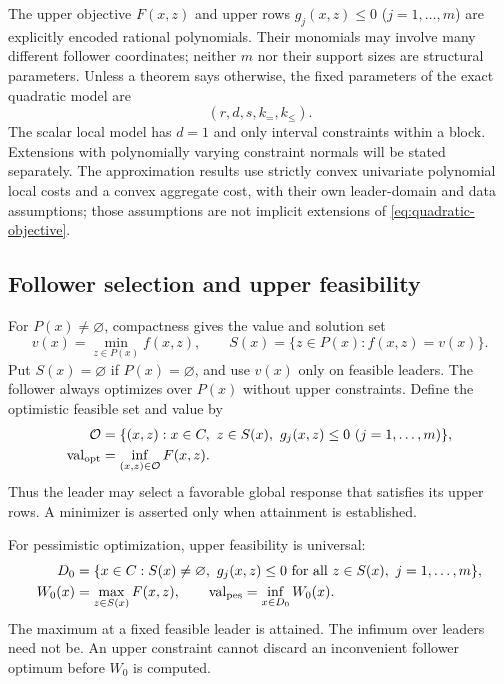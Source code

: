 The upper objective $F(x,z)$ and upper rows $g_j(x,z)\le0$
($j=1,\ldots,m$) are explicitly encoded rational polynomials.
Their monomials may involve many different follower coordinates; neither
$m$ nor their support sizes are structural parameters. Unless a theorem
says otherwise, the fixed parameters of the exact quadratic model are
\begin{equation}\label{eq:structural-parameters}
                    (r,d,s,k_=,k_{\le}).
\end{equation}
The scalar local model has $d=1$ and only interval constraints within a
block. Extensions with polynomially varying constraint normals will be
stated separately. The approximation results use strictly convex
univariate polynomial local costs and a convex aggregate cost, with their
own leader-domain and data assumptions; those assumptions are not
implicit extensions of \eqref{eq:quadratic-objective}.

\subsection{Follower selection and upper feasibility}\label{subsec:semantics}

For $P(x)\ne\varnothing$, compactness gives the value and solution set
\begin{equation}\label{eq:follower-value}
 v(x)=\min_{z\in P(x)} f(x,z),\qquad
 S(x)=\{z\in P(x):f(x,z)=v(x)\}.
\end{equation}
Put $S(x)=\varnothing$ if $P(x)=\varnothing$, and use $v(x)$ only
on feasible leaders. The follower always optimizes over $P(x)$ without
upper constraints. Define the optimistic feasible set and value by
\begin{align}
 \mathcal O&=\{(x,z):x\in C,\ z\in S(x),\
                             g_j(x,z)\le0\ (j=1,\ldots,m)\},
 \label{eq:optimistic-set}\\
 \operatorname{val}_{\rm opt}&=\inf_{(x,z)\in\mathcal O} F(x,z).
 \label{eq:optimistic-value}
\end{align}
Thus the leader may select a favorable global response that satisfies its
upper rows. A minimizer is asserted only when attainment is established.

For pessimistic optimization, upper feasibility is universal:
\begin{align}
 D_0&=\{x\in C:S(x)\ne\varnothing,\
             g_j(x,z)\le0\text{ for all }z\in S(x),\ j=1,\ldots,m\},
 \label{eq:pessimistic-domain}\\
 W_0(x)&=\max_{z\in S(x)}F(x,z),\qquad
 \operatorname{val}_{\rm pes}=\inf_{x\in D_0}W_0(x).
 \label{eq:pessimistic-value}
\end{align}
The maximum at a fixed feasible leader is attained. The infimum over
leaders need not be. An upper constraint cannot discard an inconvenient
follower optimum before $W_0$ is computed.

